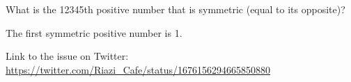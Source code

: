 \begin{problem}What is the 12345th positive number that is symmetric (equal to its opposite)?

The first symmetric positive number is 1.

Link to the issue on Twitter:  \href{https://twitter.com/Riazi_Cafe/status/1676156294665850880}{https://twitter.com/Riazi_Cafe/status/1676156294665850880}\end{problem}